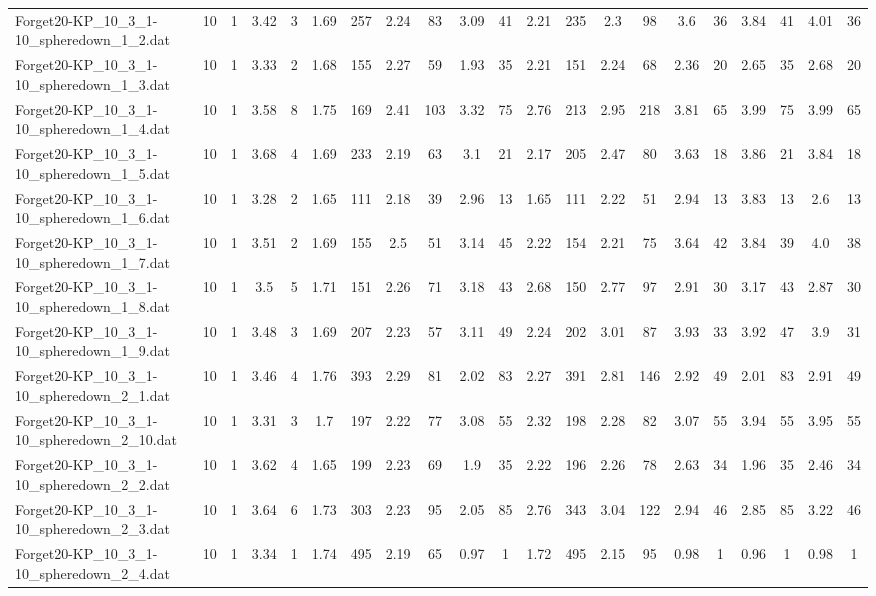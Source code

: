 \begin{sidewaystable}[!ht]
{\begin{tabular}{lcccccccccccccccccccc}
Forget20-KP\_10\_3\_1-10\_spheredown\_1\_2.dat & 10 & 1 & 3.42 & 3 & 1.69 & 257 & 2.24 & 83 & 3.09 & 41 & 2.21 & 235 & 2.3 & 98 & 3.6 & 36 & 3.84 & 41 & 4.01 & 36 \\
Forget20-KP\_10\_3\_1-10\_spheredown\_1\_3.dat & 10 & 1 & 3.33 & 2 & 1.68 & 155 & 2.27 & 59 & 1.93 & 35 & 2.21 & 151 & 2.24 & 68 & 2.36 & 20 & 2.65 & 35 & 2.68 & 20 \\
Forget20-KP\_10\_3\_1-10\_spheredown\_1\_4.dat & 10 & 1 & 3.58 & 8 & 1.75 & 169 & 2.41 & 103 & 3.32 & 75 & 2.76 & 213 & 2.95 & 218 & 3.81 & 65 & 3.99 & 75 & 3.99 & 65 \\
Forget20-KP\_10\_3\_1-10\_spheredown\_1\_5.dat & 10 & 1 & 3.68 & 4 & 1.69 & 233 & 2.19 & 63 & 3.1 & 21 & 2.17 & 205 & 2.47 & 80 & 3.63 & 18 & 3.86 & 21 & 3.84 & 18 \\
Forget20-KP\_10\_3\_1-10\_spheredown\_1\_6.dat & 10 & 1 & 3.28 & 2 & 1.65 & 111 & 2.18 & 39 & 2.96 & 13 & 1.65 & 111 & 2.22 & 51 & 2.94 & 13 & 3.83 & 13 & 2.6 & 13 \\
Forget20-KP\_10\_3\_1-10\_spheredown\_1\_7.dat & 10 & 1 & 3.51 & 2 & 1.69 & 155 & 2.5 & 51 & 3.14 & 45 & 2.22 & 154 & 2.21 & 75 & 3.64 & 42 & 3.84 & 39 & 4.0 & 38 \\
Forget20-KP\_10\_3\_1-10\_spheredown\_1\_8.dat & 10 & 1 & 3.5 & 5 & 1.71 & 151 & 2.26 & 71 & 3.18 & 43 & 2.68 & 150 & 2.77 & 97 & 2.91 & 30 & 3.17 & 43 & 2.87 & 30 \\
Forget20-KP\_10\_3\_1-10\_spheredown\_1\_9.dat & 10 & 1 & 3.48 & 3 & 1.69 & 207 & 2.23 & 57 & 3.11 & 49 & 2.24 & 202 & 3.01 & 87 & 3.93 & 33 & 3.92 & 47 & 3.9 & 31 \\
Forget20-KP\_10\_3\_1-10\_spheredown\_2\_1.dat & 10 & 1 & 3.46 & 4 & 1.76 & 393 & 2.29 & 81 & 2.02 & 83 & 2.27 & 391 & 2.81 & 146 & 2.92 & 49 & 2.01 & 83 & 2.91 & 49 \\
Forget20-KP\_10\_3\_1-10\_spheredown\_2\_10.dat & 10 & 1 & 3.31 & 3 & 1.7 & 197 & 2.22 & 77 & 3.08 & 55 & 2.32 & 198 & 2.28 & 82 & 3.07 & 55 & 3.94 & 55 & 3.95 & 55 \\
Forget20-KP\_10\_3\_1-10\_spheredown\_2\_2.dat & 10 & 1 & 3.62 & 4 & 1.65 & 199 & 2.23 & 69 & 1.9 & 35 & 2.22 & 196 & 2.26 & 78 & 2.63 & 34 & 1.96 & 35 & 2.46 & 34 \\
Forget20-KP\_10\_3\_1-10\_spheredown\_2\_3.dat & 10 & 1 & 3.64 & 6 & 1.73 & 303 & 2.23 & 95 & 2.05 & 85 & 2.76 & 343 & 3.04 & 122 & 2.94 & 46 & 2.85 & 85 & 3.22 & 46 \\
Forget20-KP\_10\_3\_1-10\_spheredown\_2\_4.dat & 10 & 1 & 3.34 & 1 & 1.74 & 495 & 2.19 & 65 & 0.97 & 1 & 1.72 & 495 & 2.15 & 95 & 0.98 & 1 & 0.96 & 1 & 0.98 & 1 \\

\end{tabular}}
\end{sidewaystable}
